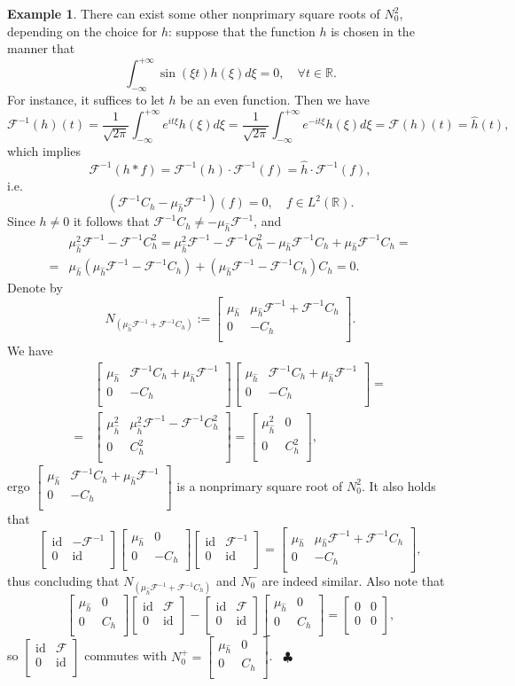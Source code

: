 \documentclass{article}
\theoremstyle{definition}
\newtheorem{example}{Example}[section]
\def\RR{\mathbb{R}}
\def\id{\operatorname{id}}
\newcommand{\mat}[4]{\left[\begin{array}{cc}#1 & #2 \\ #3 & #4 \\
	\end{array}\right]}
\begin{document}
\begin{example}
There can exist some other nonprimary square roots of $N_0^2$, depending on the choice for $h$: suppose that the function $h$ is chosen in the manner that
$$\int_{-\infty}^{+\infty} \sin (\xi t)h(\xi)d\xi=0, \quad \forall t\in\RR.$$
For instance, it suffices to let $h$ be an even function. Then we have
$$\mathcal{F}^{-1}(h)(t)=\frac{1}{\sqrt{2\pi}}\int_{-\infty}^{+\infty} e^{it\xi}h(\xi)d\xi=\frac{1}{\sqrt{2\pi}}\int_{-\infty}^{+\infty} e^{-it\xi}h(\xi)d\xi=\mathcal{F}(h)(t)=\widehat{h}(t),$$
which implies
$$\mathcal{F}^{-1}\left(h* f\right)=\mathcal{F}^{-1}(h)\cdot \mathcal{F}^{-1}(f)=\widehat{h}\cdot \mathcal{F}^{-1}(f),$$
i.e.
$$\left(\mathcal{F}^{-1}C_h - \mu_{\widehat{h}}\mathcal{F}^{-1}\right)(f)=0, \quad f\in L^2(\RR).$$
Since $h\neq0$ it follows that $\mathcal{F}^{-1}C_h\neq -\mu_{\widehat{h}}\mathcal{F}^{-1}$, and  
$$\begin{aligned}
&\mu_{\widehat{h}}^2\mathcal{F}^{-1}-\mathcal{F}^{-1}C_h^2=\mu_{\widehat{h}}^2\mathcal{F}^{-1}-\mathcal{F}^{-1}C_h^2-\mu_{\widehat{h}}\mathcal{F}^{-1}C_h+\mu_{\widehat{h}}\mathcal{F}^{-1}C_h=\\
=&\mu_{\widehat{h}}(\mu_{\widehat{h}}\mathcal{F}^{-1}-\mathcal{F}^{-1}C_h)+(\mu_{\widehat{h}}\mathcal{F}^{-1}-\mathcal{F}^{-1}C_h)C_h
=0.
\end{aligned}$$
Denote by 
$$N_{\left(\mu_{\widehat{h}}\mathcal{F}^{-1}+\mathcal{F}^{-1}C_h\right)}:=\mat{\mu_{\widehat{h}}}{\mu_{\widehat{h}}\mathcal{F}^{-1}+\mathcal{F}^{-1}C_h}{0}{-C_h}.$$
We have
$$\begin{aligned}
&\mat{\mu_{\widehat{h}}}{\mathcal{F}^{-1}C_h+\mu_{\widehat{h}}\mathcal{F}^{-1}}{0}{-C_h}\mat{\mu_{\widehat{h}}}{\mathcal{F}^{-1}C_h+\mu_{\widehat{h}}\mathcal{F}^{-1}}{0}{-C_h}=\\
=&\mat{\mu_{\widehat{h}}^2}{\mu_{\widehat{h}}^2\mathcal{F}^{-1}-\mathcal{F}^{-1}C_h^2}{0}{C_h^2}=\mat{\mu_{\widehat{h}}^2}{0}{0}{C_h^2},
\end{aligned}$$
ergo  $\mat{\mu_{\widehat{h}}}{\mathcal{F}^{-1}C_h+\mu_{\widehat{h}}\mathcal{F}^{-1}}{0}{-C_h}$ is a nonprimary square root of $N_0^2$. It also holds that
$$\mat{\id}{-\mathcal{F}^{-1}}{0}{\id}\mat{\mu_{\widehat{h}}}{0}{0}{-C_h}\mat{\id}{\mathcal{F}^{-1}}{0}{\id}=\mat{\mu_{\widehat{h}}}{\mu_{\widehat{h}}\mathcal{F}^{-1}+\mathcal{F}^{-1}C_h}{0}{-C_h},$$
thus concluding that $N_{\left(\mu_{\widehat{h}}\mathcal{F}^{-1}+\mathcal{F}^{-1}C_h\right)}$ and $N_0^-$ are indeed similar.
Also note that
$$\mat{\mu_{\widehat{h}}}{0}{0}{C_h}\mat{\id}{\mathcal{F}}{0}{\id}-\mat{\id}{\mathcal{F}}{0}{\id}\mat{\mu_{\widehat{h}}}{0}{0}{C_h}=\mat{0}{0}{0}{0},$$
so $\mat{\id}{\mathcal{F}}{0}{\id}$ commutes with $N_0^+=\mat{\mu_{\widehat{h}}}{0}{0}{C_h}$.
\  \hfill $\clubsuit$
\end{example}
\end{document}
